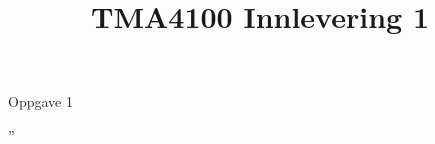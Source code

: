 \documentclass[11pt,norsk,a4paper]{article}
\begin{document}
\title{TMA4100 Innlevering 1}
\maketitle

Oppgave 1

''
\end{document}
